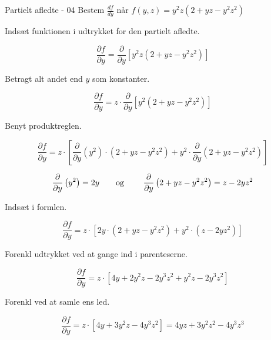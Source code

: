 \documentclass{article}
\begin{document}
\begin{exercise}{Partielt afledte - 04}
Bestem $\frac{df}{dy}$ når $f(y,z) = y^2z\left(2 + yz - y^2z^2\right)$


\hint
Indsæt funktionen i udtrykket for den partielt afledte.

\hint

\[
\frac{\partial f}{\partial y} = \frac{\partial }{\partial y} \left[y^2z\left(2 + yz - y^2z^2\right)\right]
\]

\hint
Betragt alt andet end $y$ som konstanter.

\hint
\[
\frac{\partial f}{\partial y} = z \cdot \frac{\partial }{\partial y} \left[ y^2\left(2 + yz - y^2z^2\right) \right]
\]

\hint

Benyt produktreglen.

\hint
\[
\frac{\partial f}{\partial y} = z \cdot \left[\frac{\partial }{\partial y}\left(y^2 \right) \cdot \left(2 + yz -y^2z^2 \right) + y^2 \cdot \frac{\partial}{\partial y} \left(2 + yz - y^2z^2\right) \right]
\]

\hint
\[\frac{\partial }{\partial y} \left(y^2\right) = 2y \textrm{\qquad og \qquad} \frac{\partial }{\partial y} \left(2 + yz - y^2z^2\right) = z - 2yz^2
\]

\hint
Indsæt i formlen.

\hint
\[
\frac{\partial f}{\partial y} = z \cdot \left[2y \cdot \left(2 + yz - y^2z^2\right) + y^2 \cdot (z - 2yz^2) \right]
\]

\hint
Forenkl udtrykket ved at gange ind i parenteserne.

\hint
\[
\frac{\partial f}{\partial y} = z \cdot \left[4y + 2y^2z -2y^3z^2 + y^2z -2y^3z^2 \right]
\]

\hint
Forenkl ved at samle ens led.

\hint
\[
\frac{\partial f}{\partial y} = z \cdot \left[4y + 3y^2z -4y^3z^2 \right] = 4yz + 3y^2z^2 - 4y^3z^3
\]

\end{exercise}

\newpage
\end{document}
